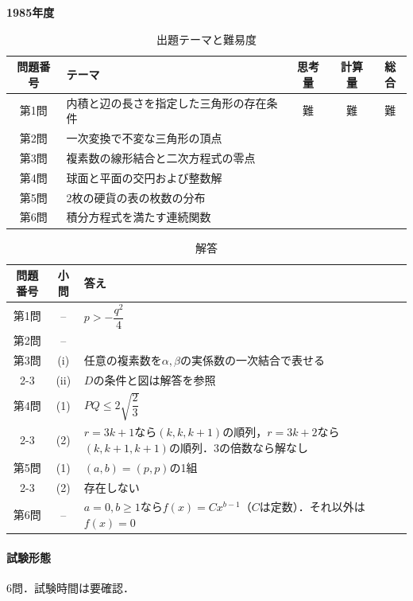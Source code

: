 \documentclass[../../main.tex]{subfiles}
\begin{document}
\begin{center}
  {\fontsize{48pt}{58pt}\selectfont \textbf{1985}\normalsize\textbf{年度}}
\end{center}

\begin{table}[htb]
  \centering
  \caption{出題テーマと難易度}
  \begin{tabular}{|c|p{6.2cm}|c|c|c|}
    \hline
    \textbf{問題番号} & \textbf{テーマ} & \textbf{思考量} & \textbf{計算量} & \textbf{総合} \\
    \hline
    第1問 & 内積と辺の長さを指定した三角形の存在条件 & 難 & 難 & 難 \\
    \hline
    第2問 & 一次変換で不変な三角形の頂点 &  &  &  \\
    \hline
    第3問 & 複素数の線形結合と二次方程式の零点 &  &  &  \\
    \hline
    第4問 & 球面と平面の交円および整数解 &  &  &  \\
    \hline
    第5問 & 2枚の硬貨の表の枚数の分布 &  &  &  \\
    \hline
    第6問 & 積分方程式を満たす連続関数 &  &  &  \\
    \hline
  \end{tabular}
\end{table}

\begin{table}[htb]
  \centering
  \caption{解答}
  \renewcommand{\arraystretch}{1.4}
  \begin{tabular}{|c|c|p{9cm}|}
    \hline
    \textbf{問題番号} & \textbf{小問} & \textbf{答え} \\
    \hline
    第1問 & -- & $p> -\dfrac{q^2}{4}$ \\
    \hline
    第2問 & -- &  \\
    \hline
    第3問 & (i) & 任意の複素数を$\alpha,\beta$の実係数の一次結合で表せる \\
    \cline{2-3}
    & (ii) & $D$の条件と図は解答を参照 \\
    \hline
    第4問 & (1) & $PQ\le2\sqrt{\dfrac{2}{3}}$ \\
    \cline{2-3}
    & (2) & $r=3k+1$なら$(k,k,k+1)$の順列，$r=3k+2$なら$(k,k+1,k+1)$の順列．$3$の倍数なら解なし \\
    \hline
    第5問 & (1) & $(a,b)=(p,p)$の1組 \\
    \cline{2-3}
    & (2) & 存在しない \\
    \hline
    第6問 & -- & $a=0,b\ge1$なら$f(x)=Cx^{b-1}$（$C$は定数）．それ以外は$f(x)=0$ \\
    \hline
  \end{tabular}
\end{table}

\paragraph{試験形態}
6問．試験時間は要確認．
\end{document}

